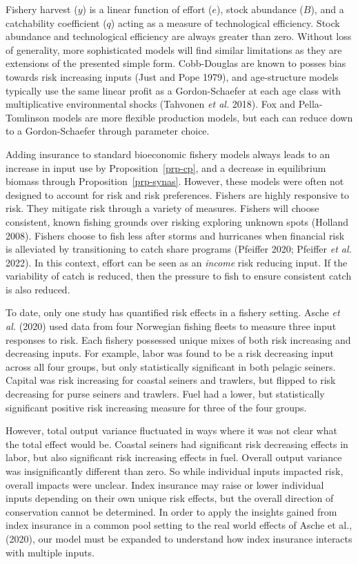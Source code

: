 \documentclass[
  letterpaper,
  DIV=11,
  numbers=noendperiod]{scrartcl}
\theoremstyle{plain}
\theoremstyle{plain}
\theoremstyle{remark}
\begin{document}
Fishery harvest (\(y\)) is a linear function of effort (\(e\)), stock
abundance (\(B\)), and a catchability coefficient (\(q\)) acting as a
measure of technological efficiency. Stock abundance and technological
efficiency are always greater than zero. Without loss of generality,
more sophisticated models will find similar limitations as they are
extensions of the presented simple form. Cobb-Douglas are known to
posses bias towards risk increasing inputs (Just and Pope 1979), and
age-structure models typically use the same linear profit as a
Gordon-Schaefer at each age class with multiplicative environmental
shocks (Tahvonen \emph{et al.} 2018). Fox and Pella-Tomlinson models are
more flexible production models, but each can reduce down to a
Gordon-Schaefer through parameter choice.

Adding insurance to standard bioeconomic fishery models always leads to
an increase in input use by Proposition~\ref{prp-cp}, and a decrease in
equilibrium biomass through Proposition~\ref{prp-synas}. However, these
models were often not designed to account for risk and risk preferences.
Fishers are highly responsive to risk. They mitigate risk through a
variety of measures. Fishers will choose consistent, known fishing
grounds over risking exploring unknown spots (Holland 2008). Fishers
choose to fish less after storms and hurricanes when financial risk is
alleviated by transitioning to catch share programs (Pfeiffer 2020;
Pfeiffer \emph{et al.} 2022). In this context, effort can be seen as an
\emph{income} risk reducing input. If the variability of catch is
reduced, then the pressure to fish to ensure consistent catch is also
reduced.

To date, only one study has quantified risk effects in a fishery
setting. Asche \emph{et al.} (2020) used data from four Norwegian
fishing fleets to measure three input responses to risk. Each fishery
possessed unique mixes of both risk increasing and decreasing inputs.
For example, labor was found to be a risk decreasing input across all
four groups, but only statistically significant in both pelagic seiners.
Capital was risk increasing for coastal seiners and trawlers, but
flipped to risk decreasing for purse seiners and trawlers. Fuel had a
lower, but statistically significant positive risk increasing measure
for three of the four groups.

However, total output variance fluctuated in ways where it was not clear
what the total effect would be. Coastal seiners had significant risk
decreasing effects in labor, but also significant risk increasing
effects in fuel. Overall output variance was insignificantly different
than zero. So while individual inputs impacted risk, overall impacts
were unclear. Index insurance may raise or lower individual inputs
depending on their own unique risk effects, but the overall direction of
conservation cannot be determined. In order to apply the insights gained
from index insurance in a common pool setting to the real world effects
of Asche et al., (2020), our model must be expanded to understand how
index insurance interacts with multiple inputs.
\end{document}
